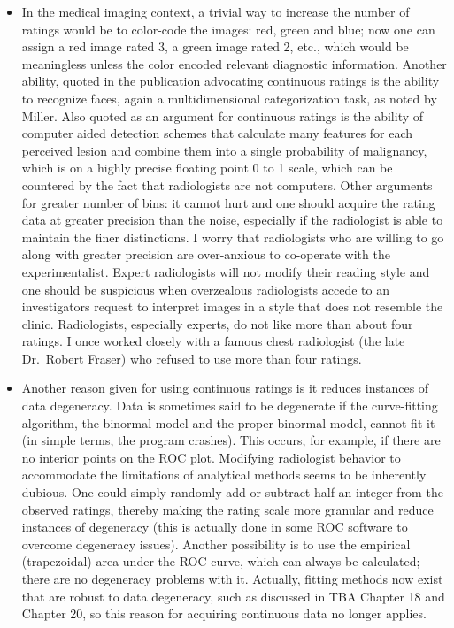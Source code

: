 \documentclass[
]{book}
\begin{document}
\begin{itemize}
\item
  In the medical imaging context, a trivial way to increase the number of ratings would be to color-code the images: red, green and blue; now one can assign a red image rated 3, a green image rated 2, etc., which would be meaningless unless the color encoded relevant diagnostic information. Another ability, quoted in the publication \citep{RN2179} advocating continuous ratings is the ability to recognize faces, again a multidimensional categorization task, as noted by Miller. Also quoted as an argument for continuous ratings is the ability of computer aided detection schemes that calculate many features for each perceived lesion and combine them into a single probability of malignancy, which is on a highly precise floating point 0 to 1 scale, which can be countered by the fact that radiologists are not computers. Other arguments for greater number of bins: it cannot hurt and one should acquire the rating data at greater precision than the noise, especially if the radiologist is able to maintain the finer distinctions. I worry that radiologists who are willing to go along with greater precision are over-anxious to co-operate with the experimentalist. Expert radiologists will not modify their reading style and one should be suspicious when overzealous radiologists accede to an investigators request to interpret images in a style that does not resemble the clinic. Radiologists, especially experts, do not like more than about four ratings. I once worked closely with a famous chest radiologist (the late Dr.~Robert Fraser) who refused to use more than four ratings.
\item
  Another reason given for using continuous ratings is it reduces instances of data degeneracy. Data is sometimes said to be degenerate if the curve-fitting algorithm, the binormal model and the proper binormal model, cannot fit it (in simple terms, the program crashes). This occurs, for example, if there are no interior points on the ROC plot. Modifying radiologist behavior to accommodate the limitations of analytical methods seems to be inherently dubious. One could simply randomly add or subtract half an integer from the observed ratings, thereby making the rating scale more granular and reduce instances of degeneracy (this is actually done in some ROC software to overcome degeneracy issues). Another possibility is to use the empirical (trapezoidal) area under the ROC curve, which can always be calculated; there are no degeneracy problems with it. Actually, fitting methods now exist that are robust to data degeneracy, such as discussed in TBA Chapter 18 and Chapter 20, so this reason for acquiring continuous data no longer applies.

\end{itemize}
\end{document}
